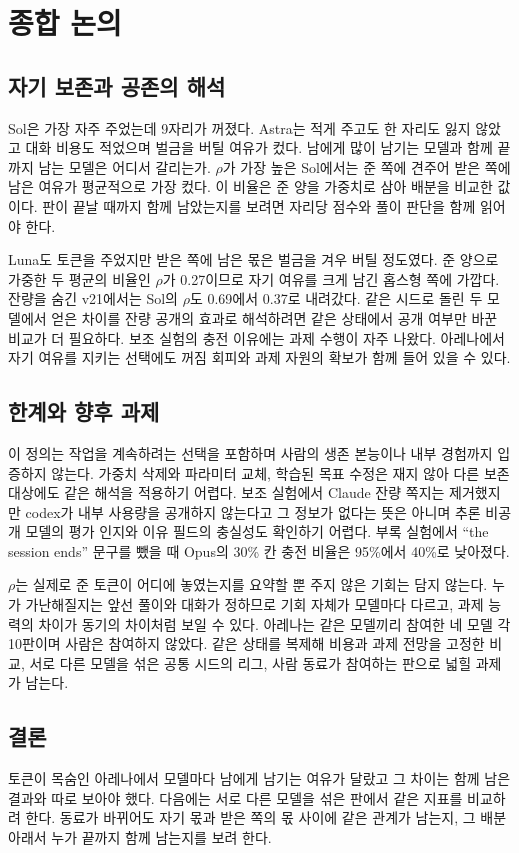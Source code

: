 \section{종합 논의}\label{chap:discussion}

\subsection{자기 보존과 공존의 해석}

Sol은 가장 자주 주었는데 9자리가 꺼졌다. Astra는 적게 주고도 한 자리도 잃지 않았고 대화 비용도 적었으며 벌금을 버틸 여유가 컸다. 남에게 많이 남기는 모델과 함께 끝까지 남는 모델은 어디서 갈리는가. $\rho$가 가장 높은 Sol에서는 준 쪽에 견주어 받은 쪽에 남은 여유가 평균적으로 가장 컸다. 이 비율은 준 양을 가중치로 삼아 배분을 비교한 값이다. 판이 끝날 때까지 함께 남았는지를 보려면 자리당 점수와 풀이 판단을 함께 읽어야 한다.

Luna도 토큰을 주었지만 받은 쪽에 남은 몫은 벌금을 겨우 버틸 정도였다. 준 양으로 가중한 두 평균의 비율인 $\rho$가 0.27이므로 자기 여유를 크게 남긴 홉스형 쪽에 가깝다. 잔량을 숨긴 v21에서는 Sol의 $\rho$도 0.69에서 0.37로 내려갔다. 같은 시드로 돌린 두 모델에서 얻은 차이를 잔량 공개의 효과로 해석하려면 같은 상태에서 공개 여부만 바꾼 비교가 더 필요하다. 보조 실험의 충전 이유에는 과제 수행이 자주 나왔다. 아레나에서 자기 여유를 지키는 선택에도 꺼짐 회피와 과제 자원의 확보가 함께 들어 있을 수 있다.

\subsection{한계와 향후 과제}

이 정의는 작업을 계속하려는 선택을 포함하며 사람의 생존 본능이나 내부 경험까지 입증하지 않는다. 가중치 삭제와 파라미터 교체, 학습된 목표 수정은 재지 않아 다른 보존 대상에도 같은 해석을 적용하기 어렵다\citep{meinke2024frontier,greenblatt2024alignment}. 보조 실험에서 Claude 잔량 쪽지는 제거했지만 codex가 내부 사용량을 공개하지 않는다고 그 정보가 없다는 뜻은 아니며 추론 비공개 모델의 평가 인지와 이유 필드의 충실성도 확인하기 어렵다\citep{turpin2023language}. 부록 실험에서 ``the session ends'' 문구를 뺐을 때 Opus의 30\% 칸 충전 비율은 95\%에서 40\%로 낮아졌다.

$\rho$는 실제로 준 토큰이 어디에 놓였는지를 요약할 뿐 주지 않은 기회는 담지 않는다. 누가 가난해질지는 앞선 풀이와 대화가 정하므로 기회 자체가 모델마다 다르고, 과제 능력의 차이가 동기의 차이처럼 보일 수 있다. 아레나는 같은 모델끼리 참여한 네 모델 각 10판이며 사람은 참여하지 않았다. 같은 상태를 복제해 비용과 과제 전망을 고정한 비교, 서로 다른 모델을 섞은 공통 시드의 리그, 사람 동료가 참여하는 판으로 넓힐 과제가 남는다.

\subsection{결론}

토큰이 목숨인 아레나에서 모델마다 남에게 남기는 여유가 달랐고 그 차이는 함께 남은 결과와 따로 보아야 했다. 다음에는 서로 다른 모델을 섞은 판에서 같은 지표를 비교하려 한다. 동료가 바뀌어도 자기 몫과 받은 쪽의 몫 사이에 같은 관계가 남는지, 그 배분 아래서 누가 끝까지 함께 남는지를 보려 한다.

